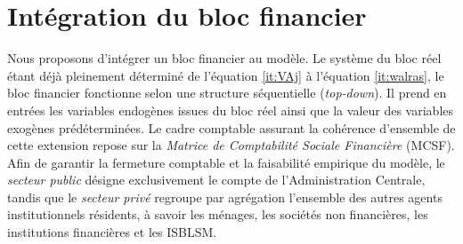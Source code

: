 \documentclass[11pt,a4paper]{article}
\begin{document}
	\section{Intégration du bloc financier}    
	Nous proposons d'intégrer un bloc financier au modèle. Le système du bloc réel étant déjà pleinement déterminé de l'équation \eqref{it:VAj} à l'équation \eqref{it:walras}, le bloc financier fonctionne selon une structure séquentielle (\textit{top-down}). Il prend en entrées les variables endogènes issues du bloc réel ainsi que la valeur des variables exogènes prédéterminées. Le cadre comptable assurant la cohérence d'ensemble de cette extension repose sur la \textit{Matrice de Comptabilité Sociale Financière} (MCSF). Afin de garantir la fermeture comptable et la faisabilité empirique du modèle, le \textit{secteur public} désigne exclusivement le compte de l'Administration Centrale, tandis que le \textit{secteur privé} regroupe par agrégation l'ensemble des autres agents institutionnels résidents, à savoir les ménages, les sociétés non financières, les institutions financières et les ISBLSM.
	
\end{document}
